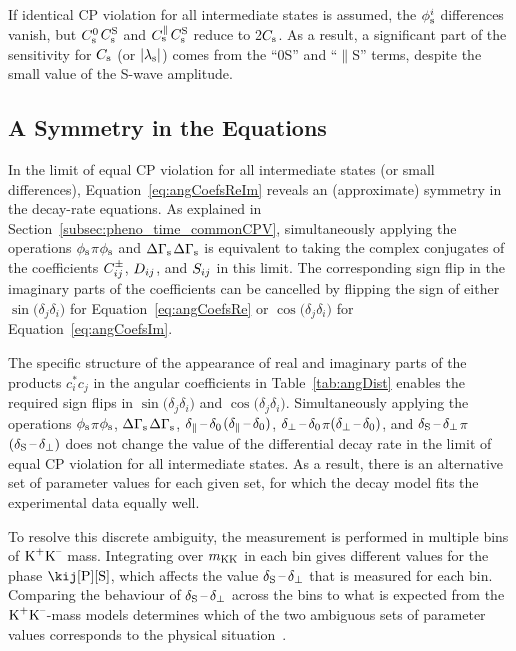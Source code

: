 If identical CP violation for all intermediate states is assumed, the $\phisi$ differences vanish, but $\Cszero$\textplus$\CsS$ and
$\Cspar$\textplus$\CsS$ reduce to 2$\Cs$. As a result, a significant part of the sensitivity for $\Cs$ (or $\lamsAbs$) comes from the
``0S'' and ``$\parallel$S'' terms, despite the small value of the S-wave amplitude.


\subsection{A Symmetry in the Equations}
\label{subsec:pheno_equations_symmetry}

In the limit of equal CP violation for all intermediate states (or small differences), Equation~\ref{eq:angCoefsReIm} reveals an
(approximate) symmetry in the decay-rate equations. As explained in Section~\ref{subsec:pheno_time_commonCPV}, simultaneously applying the
operations $\phis$\textto$\pi$\textminus$\phis$ and $\DGs$\textto\tm$\DGs$ is equivalent to taking the complex conjugates of the
coefficients $\Cf[ij]^\pm$, $\Df[ij]$, and $\Sf[ij]$ in this limit. The corresponding sign flip in the imaginary parts of the coefficients
can be cancelled by flipping the sign of either $\sin(\delta_j$\textminus$\delta_i)$ for Equation~\ref{eq:angCoefsRe} or
$\cos(\delta_j$\textminus$\delta_i)$ for Equation~\ref{eq:angCoefsIm}.

The specific structure of the appearance of real and imaginary parts of the products $c_i^*c_j$ in the angular coefficients in
Table~\ref{tab:angDist} enables the required sign flips in $\sin(\delta_j$\textminus$\delta_i)$ and $\cos(\delta_j$\textminus$\delta_i)$.
Simultaneously applying the operations $\phis$\textto$\pi$\textminus$\phis$, $\DGs$\textto\tm$\DGs$,
$\delparzero$\textto\tm$(\delparzero)$, $\delperpzero$\textto$\pi$\textminus$(\delperpzero)$, and
$\delSperp$\textto$\pi$\textminus$(\delSperp)$ does not change the value of the \BstoJpsiKK{} differential decay rate in the limit of equal
CP violation for all intermediate states. As a result, there is an alternative set of parameter values for each given set, for which the
decay model fits the experimental data equally well.

To resolve this discrete ambiguity, the measurement is performed in multiple bins of $\KK$ mass. Integrating over $\mKK$ in each bin gives
different values for the phase $\thetaSP$, which affects the value $\delSperp$ that is measured for each bin. Comparing the behaviour of
$\delSperp$ across the bins to what is expected from the $\KK$-mass models determines which of the two ambiguous sets of parameter values
corresponds to the physical situation~\cite{Xie:2009fs}.

